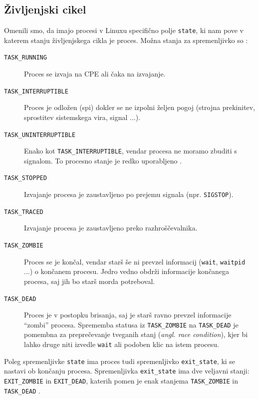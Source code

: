 \documentclass[a4paper,12pt,openright]{book}
\begin{document}
\subsection{Življenjski cikel} \label{ssec:linux_process:lifecycle} %

Omenili smo, da imajo procesi v Linuxu specifično polje \texttt{state}, ki nam pove v katerem stanju življenjskega cikla je proces.
Možna stanja za spremenljivko so \cite{Bovet_Cesati_2005}:
\begin{description}
	\item[\texttt{TASK\_RUNNING}] Proces se izvaja na CPE ali čaka na izvajanje.
	\item[\texttt{TASK\_INTERRUPTIBLE}] Proces je odložen (spi) dokler se ne izpolni željen pogoj (strojna prekinitev, sprostitev sistemskega vira, signal ...).
	\item[\texttt{TASK\_UNINTERRUPTIBLE}] Enako kot \texttt{TASK\_INTERRUPTIBLE}, vendar procesa ne moramo zbuditi s signalom.
	To procesno stanje je redko uporabljeno \cite{Bovet_Cesati_2005}.
	\item[\texttt{TASK\_STOPPED}] Izvajanje procesa je zaustavljeno po prejemu signala (npr. \texttt{SIGSTOP}).
	\item[\texttt{TASK\_TRACED}] Izvajanje procesa je zaustavljeno preko razhroščevalnika.
	\item[\texttt{TASK\_ZOMBIE}] Proces se je končal, vendar starš še ni prevzel informacij (\texttt{wait}, \texttt{waitpid} ...) o končanem procesu.
	Jedro vedno obdrži informacije končanega procesa, saj jih bo starš morda potreboval.
	\item[\texttt{TASK\_DEAD}] Proces je v postopku brisanja, saj je starš ravno prevzel informacije ``zombi'' procesa.
	Sprememba statusa iz \texttt{TASK\_ZOMBIE} na \texttt{TASK\_DEAD} je pomembna za preprečevanje tveganih stanj (\textit{angl. race condition}), kjer bi lahko druge niti izvedle \texttt{wait} ali podoben klic na istem procesu.
\end{description}

Poleg spremenljivke \texttt{state} ima proces tudi spremenljivko \texttt{exit\_state}, ki se nastavi ob končanju procesa.
Spremenljivka \texttt{exit\_state} ima dve veljavni stanji: \texttt{EXIT\_ZOMBIE} in \texttt{EXIT\_DEAD}, katerih pomen je enak stanjema \texttt{TASK\_ZOMBIE} in \texttt{TASK\_DEAD} \cite{Bovet_Cesati_2005}.
\end{document}
